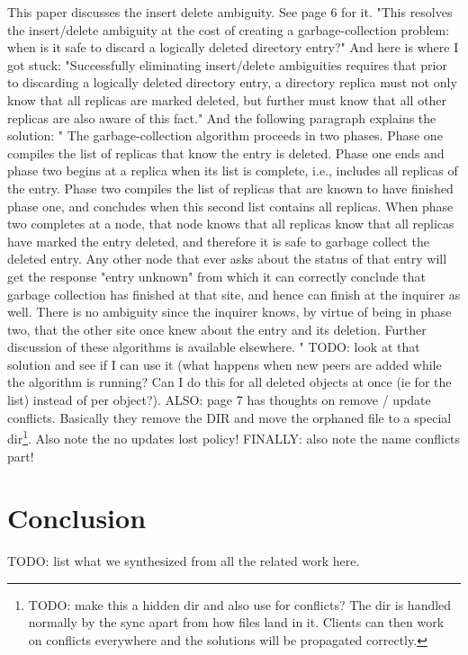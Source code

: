 This paper discusses the insert delete ambiguity.
See page 6 for it.
"This resolves the insert/delete ambiguity at the cost of creating a garbage-collection problem: when is it safe to discard a logically deleted directory entry?"
And here is where I got stuck: "Successfully eliminating insert/delete ambiguities requires that prior to discarding a logically deleted directory entry, a directory replica must not only know that all replicas are marked deleted, but further must know that all other replicas are also aware of this fact."
And the following paragraph explains the solution: "
The garbage-collection algorithm proceeds in two phases.
Phase one compiles the list of replicas that know the entry is deleted.
Phase one ends and phase two begins at a replica when its list is complete, i.e., includes all replicas of the entry.
Phase two compiles the list of replicas that are known to have finished phase one, and concludes when this second list contains all replicas.
When phase two completes at a node, that node knows that all replicas know that all replicas have marked the entry deleted, and therefore it is safe to garbage collect the deleted entry.
Any other node that ever asks about the status of that entry will get the response "entry unknown" from which it can correctly conclude that garbage collection has finished at that site, and hence can finish at the inquirer as well.
There is no ambiguity since the inquirer knows, by virtue of being in phase two, that the other site once knew about the entry and its deletion.
Further discussion of these algorithms is available elsewhere.
"
TODO: look at that solution and see if I can use it (what happens when new peers are added while the algorithm is running? Can I do this for all deleted objects at once (ie for the list) instead of per object?).
ALSO: page 7 has thoughts on remove / update conflicts.
Basically they remove the DIR and move the orphaned file to a special dir\footnote{TODO: make this a hidden dir and also use for conflicts? The dir is handled normally by the sync apart from how files land in it. Clients can then work on conflicts everywhere and the solutions will be propagated correctly.}.
Also note the no updates lost policy!
FINALLY: also note the name conflicts part!

\section{Conclusion}

TODO: list what we synthesized from all the related work here.

